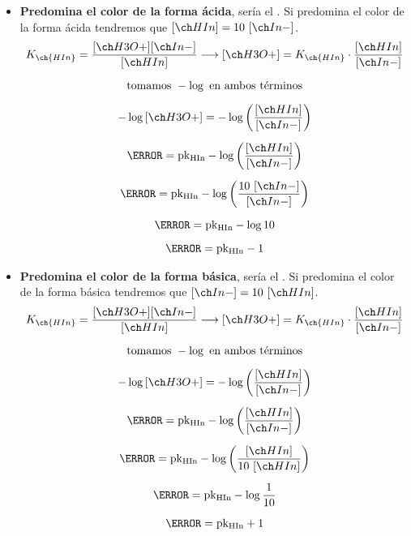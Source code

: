 \begin{itemize}
    \item \textbf{Predomina el color de la forma ácida}, sería el . Si predomina el color de la forma ácida tendremos que \( \conc{HIn} = 10\ \conc{In-}  \).
    \begin{gather}
        K_{\ch{HIn}} = \dfrac{\conc{H3O+}\conc{In-}}{\conc{HIn}} \longrightarrow \conc{H3O+} = K_{\ch{HIn}} \cdot \dfrac{\conc{HIn}}{\conc{In-}} \notag \\[2mm]
        \text{tomamos } -\log \text{ en ambos términos}\notag \\[2mm]
        -\log{\conc{H3O+}} = -\log{\left( \dfrac{\conc{HIn}}{\conc{In-}} \right)} \notag \\[2mm]
        \pH = \text{pk\subin{HIn}}  -\log{\left( \dfrac{\conc{HIn}}{\conc{In-}} \right)} \notag \\[2mm]
        \pH = \text{pk\subin{HIn}}  -\log{\left( \dfrac{10\ \conc{In-}}{\conc{In-}} \right)} \notag \\[2mm]
        \pH = \text{pk\subin{HIn}}  -\log{10} \notag \\[2mm]
        \pH = \text{pk\subin{HIn}}  - 1 \label{eq:intervalo_ph_resta_1}
    \end{gather}
    \item \textbf{Predomina el color de la forma básica}, sería el .
    Si predomina el color de la forma básica tendremos que \( \conc{In-} = 10\ \conc{HIn}  \).
    \begin{gather}
        K_{\ch{HIn}} = \dfrac{\conc{H3O+}\conc{In-}}{\conc{HIn}} \longrightarrow \conc{H3O+} = K_{\ch{HIn}} \cdot \dfrac{\conc{HIn}}{\conc{In-}} \notag \\[2mm]
        \text{tomamos } -\log \text{ en ambos términos}\notag \\[2mm]
        -\log{\conc{H3O+}} = -\log{\left( \dfrac{\conc{HIn}}{\conc{In-}} \right)} \notag \\[2mm]
        \pH = \text{pk\subin{HIn}}  -\log{\left( \dfrac{\conc{HIn}}{\conc{In-}} \right)} \notag \\[2mm]
        \pH = \text{pk\subin{HIn}}  -\log{\left( \dfrac{\conc{HIn}}{10\ \conc{HIn}} \right)} \notag \\[2mm]
        \pH = \text{pk\subin{HIn}}  -\log{\dfrac{1}{10}} \notag \\[2mm]
        \pH = \text{pk\subin{HIn}}  + 1 \label{eq:intervalo_ph_suma_1}
    \end{gather}
\end{itemize}

